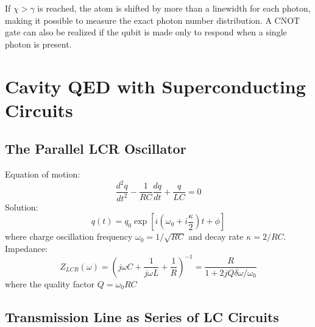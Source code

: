 \documentclass[8pt,a4paper,twocolumn]{article} %
\numberwithin{equation}{section} %
\begin{document}
			If $\chi>\gamma$ is reached, the atom is shifted by more than a linewidth for each photon, making it possible to measure the exact photon number distribution. A CNOT gate can also be realized if the qubit is made only to respond when a single photon is present.








	\section{Cavity QED with Superconducting Circuits} %
	\label{sec:cavity_qed_with_superconducting_circuits}
		\subsection{The Parallel LCR Oscillator} %
		\label{sub:the_lcr_oscillator}
			Equation of motion:
			\begin{equation}
				\frac{d^2 q}{dt^2}-\frac{1}{RC}\frac{dq}{dt}+\frac{q}{LC}=0
			\end{equation}
			Solution:
			\begin{equation}
				q(t)=q_0\exp\left[ i(\omega_0 +i \frac{\kappa}{2})t+\phi \right]
			\end{equation}
			where charge oscillation frequency $\omega_0=1/\sqrt{RC} $ and decay rate $ \kappa=2/RC $.\\
			Impedance:
			\begin{equation}
				Z_{LCR}(\omega)=\left( j \omega C+\frac{1}{j \omega L}+\frac{1}{R} \right)^{-1}=\frac{R}{1+2jQ \delta \omega/\omega_0}
			\end{equation}
			where the quality factor $Q=\omega_0 RC $

		\subsection{Transmission Line as Series of LC Circuits} %
		\label{sub:transmission_line_as_series_of_lc_circuits}
			
\end{document}
